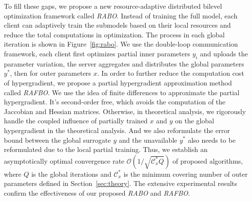 \documentclass[lettersize,journal]{IEEEtran}
\begin{document}
To fill these gaps, we propose a new resource-adaptive distributed bilevel optimization framework called \textit{RABO}.
Instead of training the full model, each client can adaptively train the submodels based on their local resources and reduce the total computations in optimization. 
The process in each global iteration is shown in Figure~\ref{fig:rabo}. We use the double-loop communication framework, each client first optimizes partial inner parameters $y_i$ and uploads the parameter variation, the server aggregates and distributes the global parameters $y^*$, then for outer parameters $x$. 
In order to further reduce the computation cost of hypergradient, we propose a partial hypergradient approximation method called \textit{RAFBO}. We use the idea of finite differences to approximate the partial hypergradient. It's second-order free, which avoids the computation of the Jaccobian and Hessian matrices. 
Otherwise, in theoretical analysis, we rigorously handle the coupled influence of partially trained $x$ and $y$ on the global hypergradient in the theoretical analysis. 
And we also reformulate the error bound between the global surrogate $y$ and the unavailable $y^*$ also needs to be reformulated due to the local partial training.
Thus, we establish an asymptotically optimal convergence rate $\mathcal{O}(1/\sqrt{\mathcal{C}^*_xQ})$ of proposed algorithms, where $Q$ is the global iterations and $\mathcal{C}^*_x$ is the minimum covering number of outer parameters defined in Section~\ref{sec:theory}. The extensive experimental results confirm the effectiveness of our proposed \textit{RABO} and \textit{RAFBO}. 
\end{document}
